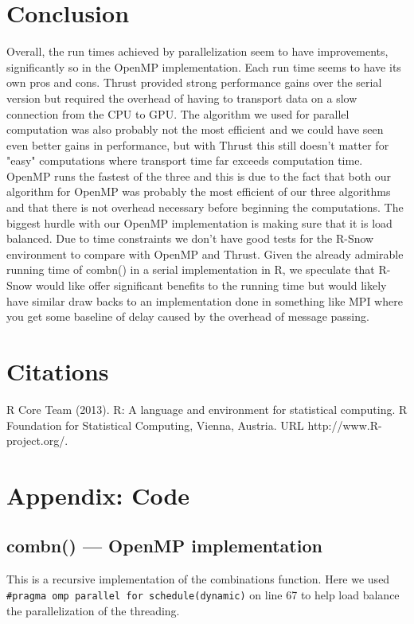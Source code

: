 \documentclass[titlepage, 11pt]{article}
\begin{document}
\section{Conclusion}
Overall, the run times achieved by parallelization seem to have improvements, significantly so in the OpenMP implementation. Each run time seems to have its own pros and cons. Thrust provided strong performance gains over the serial version but required the overhead of having to transport data on a slow connection from the CPU to GPU. The algorithm we used for parallel computation was also probably not the most efficient and we could have seen even better gains in performance, but with Thrust this still doesn't matter for "easy" computations where transport time far exceeds computation time. OpenMP runs the fastest of the three and this is due to the fact that both our algorithm for OpenMP was probably the most efficient of our three algorithms and that there is not overhead necessary before beginning the computations. The biggest hurdle with our OpenMP implementation is making sure that it is load balanced. Due to time constraints we don't have good tests for the R-Snow environment to compare with OpenMP and Thrust. Given the already admirable running time of combn() in a serial implementation in R, we speculate that R-Snow would like offer significant benefits to the running time but would likely have similar draw backs to an implementation done in something like MPI where you get some baseline of delay caused by the overhead of message passing.


\section{Citations}
  R Core Team (2013). R: A language and environment for statistical computing. R Foundation for Statistical
  Computing, Vienna, Austria. URL http://www.R-project.org/.

\pagebreak
\appendix
\section{Appendix: Code}
\subsection{combn() --- OpenMP implementation}

This is a recursive implementation of the combinations function. Here we used \\
 \verb;#pragma omp parallel for schedule(dynamic); on line 67 to help load balance the parallelization of the threading.  \\
\end{document}
